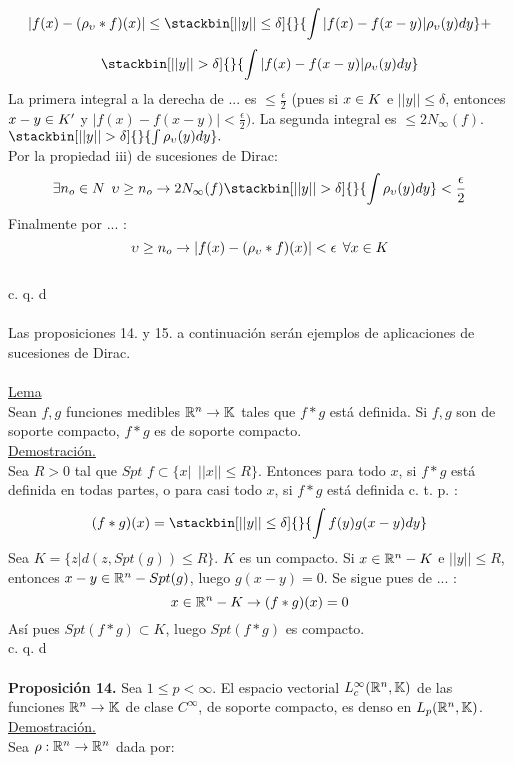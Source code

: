 \begin{equation}
|f(x)-(\rho_\upsilon * f)(x)| \leq \stackbin[||y|| \leq \delta]{}{\int |f(x)-f(x-y)|\rho_\upsilon (y)dy}+
\end{equation}
$$
\stackbin[||y|| > \delta]{}{\int| f(x)-f(x-y)|\rho_\upsilon (y)dy}
$$
La primera integral a la derecha de ... es $\leq \frac{\epsilon}{2}$ (pues si $x \in K$ e $||y|| \leq \delta$, entonces $x-y \in K'$ y $|f(x)-f(x-y)|<\frac{\epsilon}{2})$. La segunda integral es $\leq 2 N_\infty (f)$. $\stackbin[||y|| > \delta]{}{\int \rho_\upsilon (y)dy}.$ \\
Por la propiedad iii) de sucesiones de Dirac:
$$
\exists n_o \en N \phantom{s} \upsilon \geq n_o \flecha 2N_\infty (f) \stackbin[||y|| > \delta]{}{\int \rho_\upsilon (y)dy}<\frac{\epsilon}{2}
$$
Finalmente por ... :
$$
\upsilon \geq n_o \rightarrow |f(x)-(\rho_\upsilon * f)(x)| <\epsilon \phantom{s} \forall x \in K
$$
\\
 \phantom{sssssssssssssssssssssssssssssssssss sasdasdasdasdadadssada} c. q. d \\ \\
 Las proposiciones 14. y 15. a continuación serán ejemplos de aplicaciones de sucesiones de Dirac. \\ \\
 \underline{Lema} \\
 Sean $f,g$ funciones medibles $\mathbb{R}^n \rightarrow \mathbb{K}$ tales que $f*g$ está definida. Si $f,g$ son de soporte compacto, $f*g$ es de soporte compacto. \\
 \underline{Demostración.} \\
 Sea $R>0$ tal que $Spt$ $f \subset \lbrace x| \phantom{s} ||x|| \leq R \rbrace$. Entonces para todo $x$, si $f*g$ está definida en todas partes, o para casi todo $x$, si $f*g$ está definida c. t. p. :
 \begin{equation}
 (f*g)(x)= \stackbin[||y|| \leq \delta]{}{\int f(y)g(x-y)dy}
 \end{equation}
Sea $K=\lbrace z|d(z,Spt(g)) \leq R \rbrace$. $K$ es un compacto. Si $x \in \mathbb{R}^n - K$ e $||y|| \leq R$, entonces $x-y\in \mathbb{R}^n-Spt(g)$, luego $g(x-y)=0$. Se sigue pues de ... :
$$
x\in \mathbb{R}^n -K \rightarrow (f*g)(x)=0
$$
Así pues $Spt(f*g) \subset K$, luego $Spt(f*g)$ es compacto.  \\
 \phantom{sssssssssssssssssssssssssssssssssss sasdasdasdasdadadssada} c. q. d \\ \\

\textbf{Proposición 14.}
Sea $1 \leq p < \infty$. El espacio vectorial $L_c^\infty (\mathbb{R}^n, \mathbb{K})$ de las funciones $\mathbb{R}^n \rightarrow \mathbb{K}$ de clase $C^\infty$, de soporte compacto, es denso en $L_p (\mathbb{R}^n, \mathbb{K})$. \\
\underline{Demostración.} \\
Sea $\rho:\mathbb{R}^n \rightarrow \mathbb{R}^n$ dada por:

